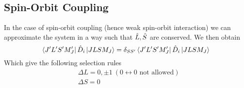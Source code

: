 \documentclass[../qm.tex]{subfiles}
\begin{document}
	\subsection{Spin-Orbit Coupling}
	In the case of spin-orbit coupling (hence weak spin-orbit interaction) we can approximate the system in a way such that $\hat{L},\hat{S}$ are conserved. We then obtain
	\begin{equation}
		\bra{J'L'S'M_J'}\hat{D}_i\ket{JLSM_J}=\delta_{SS'}\bra{J'L'S'M_J'}\hat{D}_i\ket{JLSM_J}
		\label{eq:matrixelementDmanyelec}
	\end{equation}
	Which give the following selection rules
	\begin{equation}
		\begin{aligned}
			&\boxed{\boxed{\Delta L=0,\pm1}}\ (0\leftrightarrow0\text{ not allowed})\\
			&\boxed{\boxed{\Delta S=0}}
		\end{aligned}
		\label{eq:LSselectionrules}
	\end{equation}
\end{document}
